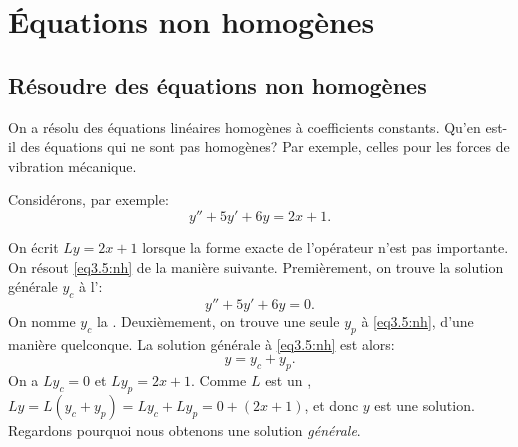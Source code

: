 
\sectionnewpage
\section{Équations non homogènes }
\label{sec:nonhom}
%

\subsection{Résoudre des équations non homogènes }

On a résolu des équations linéaires homogènes à coefficients constants. 
Qu'en est-il des équations qui ne sont pas homogènes? 
Par exemple, celles pour les forces de vibration mécanique. 


Considérons, par exemple:  
\begin{equation} \label{eq3.5:nh}
	y'' + 5y'+ 6y = 2x+1 .
\end{equation}

On écrit  $Ly = 2x+1$ lorsque la forme exacte de l'opérateur n'est pas importante. 
On résout \eqref{eq3.5:nh} de la manière suivante. 
Premièrement, on trouve la solution générale  $y_c$
à l'\emph{}: 
\begin{equation} \label{eq3.5:h}
	y'' + 5y'+ 6y = 0 .
\end{equation}
On nomme $y_c$ la \emph{}.
Deuxièmement, on trouve une seule \emph{} $y_p$ à \eqref{eq3.5:nh}, d'une manière quelconque.  La solution générale à \eqref{eq3.5:nh} est alors: 
\begin{equation*}
	y = y_c + y_p.
\end{equation*}
On a  $L y_c = 0$ et $L y_p = 2x+1$.  
Comme $L$ est un \emph{}, 
$L y = L ( y_c + y_p) = L y_c + L y_p = 0 + (2x+1)$, 
et donc $y$ est une solution. 
Regardons pourquoi nous obtenons une  solution  \emph{générale}.

